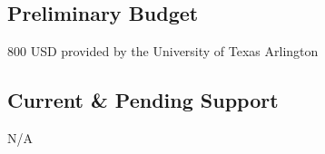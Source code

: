 \subsection{Preliminary Budget}
800 USD provided by the University of Texas Arlington

\subsection{Current \& Pending Support}
N/A